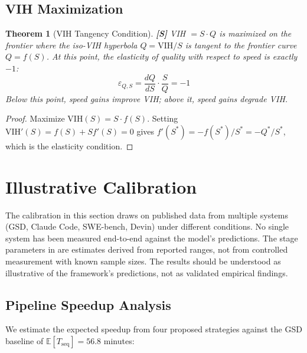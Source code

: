 \documentclass[11pt, a4paper, copyright]{googledeepmind}
\newtheorem{theorem}{Theorem}[section]
\newcommand{\VIH}{\mathrm{VIH}}
\newcommand{\E}{\mathbb{E}}
\begin{document}
\subsection{VIH Maximization}

\begin{theorem}[VIH Tangency Condition]\label{thm:tangency}
\textbf{[S]} VIH $= S \cdot Q$ is maximized on the frontier where the iso-VIH hyperbola $Q = \VIH/S$ is tangent to the frontier curve $Q = f(S)$. At this point, the elasticity of quality with respect to speed is exactly $-1$:
\[
    \varepsilon_{Q,S} = \frac{dQ}{dS} \cdot \frac{S}{Q} = -1
\]
Below this point, speed gains improve VIH; above it, speed gains degrade VIH.
\end{theorem}

\begin{proof}
Maximize $\VIH(S) = S \cdot f(S)$. Setting $\VIH'(S) = f(S) + S f'(S) = 0$ gives $f'(S^*) = -f(S^*)/S^* = -Q^*/S^*$, which is the elasticity condition.
\end{proof}


\section{Illustrative Calibration}\label{sec:calibration}

The calibration in this section draws on published data from multiple systems (GSD, Claude Code, SWE-bench, Devin) under different conditions. No single system has been measured end-to-end against the model's predictions. The stage parameters in  are estimates derived from reported ranges, not from controlled measurement with known sample sizes. The results should be understood as illustrative of the framework's predictions, not as validated empirical findings.

\subsection{Pipeline Speedup Analysis}

We estimate the expected speedup from four proposed strategies against the GSD baseline of $\E[T_{\mathrm{seq}}] = 56.8$ minutes:
\end{document}
